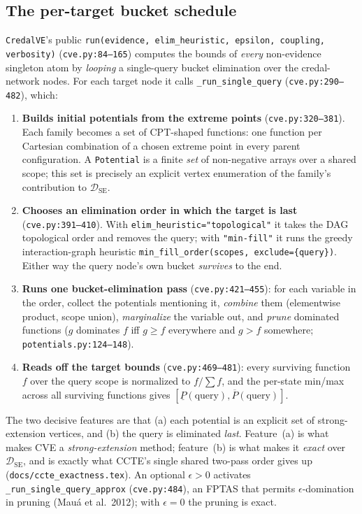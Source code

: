 \documentclass[11pt]{article}
\newcommand{\lo}{\underline}
\newcommand{\hi}{\overline}
\newcommand{\DSE}{\mathcal{D}_{\mathrm{SE}}}
\newcommand{\CVE}{\texttt{CredalVE}}
\begin{document}
\subsection{The per-target bucket schedule}\label{sec:schedule}
\CVE{}'s public \texttt{run(evidence, elim\_heuristic, epsilon, coupling, verbosity)}
(\texttt{cve.py:84--165}) computes the bounds of \emph{every} non-evidence singleton atom by
\emph{looping} a single-query bucket elimination over the credal-network nodes. For each target node
it calls \texttt{\_run\_single\_query} (\texttt{cve.py:290--482}), which:
\begin{enumerate}
  \item \textbf{Builds initial potentials from the extreme points} (\texttt{cve.py:320--381}). Each
    family becomes a set of CPT-shaped functions: one function per Cartesian combination of a chosen
    extreme point in every parent configuration. A \texttt{Potential} is a finite \emph{set} of
    non-negative arrays over a shared scope; this set is precisely an explicit vertex enumeration of
    the family's contribution to $\DSE$.
  \item \textbf{Chooses an elimination order in which the target is last}
    (\texttt{cve.py:391--410}). With \texttt{elim\_heuristic="topological"} it takes the DAG
    topological order and removes the query; with \texttt{"min-fill"} it runs the greedy
    interaction-graph heuristic \texttt{min\_fill\_order(scopes, exclude=\{query\})}. Either way the
    query node's own bucket \emph{survives} to the end.
  \item \textbf{Runs one bucket-elimination pass} (\texttt{cve.py:421--455}): for each variable in
    the order, collect the potentials mentioning it, \emph{combine} them (elementwise product,
    scope union), \emph{marginalize} the variable out, and \emph{prune} dominated functions
    ($g$ dominates $f$ iff $g\ge f$ everywhere and $g>f$ somewhere; \texttt{potentials.py:124--148}).
  \item \textbf{Reads off the target bounds} (\texttt{cve.py:469--481}): every surviving function
    $f$ over the query scope is normalized to $f/\sum f$, and the per-state min/max across all
    surviving functions gives $[\lo P(\text{query}),\hi P(\text{query})]$.
\end{enumerate}
The two decisive features are that (a) each potential is an explicit set of strong-extension
vertices, and (b) the query is eliminated \emph{last}. Feature~(a) is what makes CVE a
\emph{strong-extension} method; feature~(b) is what makes it \emph{exact} over $\DSE$, and is
exactly what CCTE's single shared two-pass order gives up (\texttt{docs/ccte\_exactness.tex}). An
optional $\epsilon>0$ activates \texttt{\_run\_single\_query\_approx} (\texttt{cve.py:484}), an
FPTAS that permits $\epsilon$-domination in pruning (Mau\'a et al.\ 2012); with $\epsilon=0$ the
pruning is exact.
\end{document}
